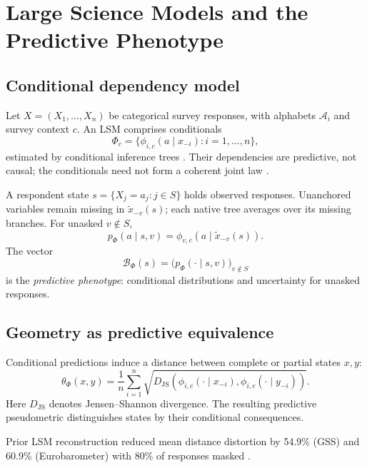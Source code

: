 \documentclass[technote,10pt]{IEEEtran}
\newcommand{\calB}{\mathcal{B}}
\newcommand{\JS}{D_{\mathrm{JS}}}
\newcommand{\Ph}{\Phi}
\begin{document}
\section{Large Science Models and the Predictive Phenotype}
\subsection{Conditional dependency model}
Let $X=(X_1,\ldots,X_n)$ be categorical survey responses, with alphabets $\mathcal A_i$ and survey context $c$. An LSM comprises conditionals
\begin{equation}
\Ph_c=\{\phi_{i,c}(a\mid x_{-i}) : i=1,\ldots,n\},
\label{eq:lsm}
\end{equation}
estimated by conditional inference trees \cite{hothorn2006,sizemore2024,dahal2026}. Their dependencies are predictive, not causal; the conditionals need not form a coherent joint law \cite{heckerman2000}.

A respondent state $s=\{X_j=a_j:j\in S\}$ holds observed responses. Unanchored variables remain missing in $\widetilde x_{-v}(s)$; each native tree averages over its missing branches. For unasked $v\notin S$,
\begin{equation}
p_\Ph(a\mid s,v)=\phi_{v,c}(a\mid\widetilde x_{-v}(s)).
\label{eq:predict}
\end{equation}
The vector
\begin{equation}
\calB_\Ph(s)=\bigl(p_\Ph(\cdot\mid s,v)\bigr)_{v\notin S}
\label{eq:beliefstate}
\end{equation}
is the \emph{predictive phenotype}: conditional distributions and uncertainty for unasked responses.

\subsection{Geometry as predictive equivalence}
Conditional predictions induce a distance between complete or partial states $x,y$:
\begin{equation}
\theta_\Ph(x,y)=\frac{1}{n}\sum_{i=1}^n
\sqrt{\JS\!\left(
\phi_{i,c}(\cdot\mid x_{-i}),\phi_{i,c}(\cdot\mid y_{-i})
\right)}.
\label{eq:metric}
\end{equation}
Here $\JS$ denotes Jensen--Shannon divergence. The resulting predictive pseudometric distinguishes states by their conditional consequences.

Prior LSM reconstruction reduced mean distance distortion by 54.9\% (GSS) and 60.9\% (Eurobarometer) with 80\% of responses masked \cite{dahal2026}.
\end{document}
